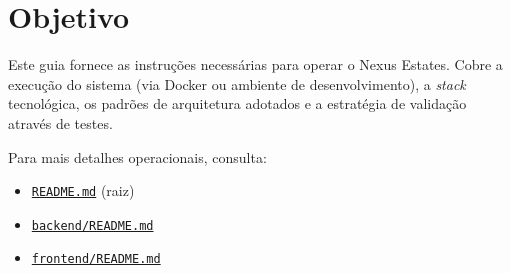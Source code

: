 \section{Objetivo}
Este guia fornece as instruções necessárias para operar o Nexus Estates. Cobre a execução do sistema (via Docker ou ambiente de desenvolvimento), a \textit{stack} tecnológica, os padrões de arquitetura adotados e a estratégia de validação através de testes.

Para mais detalhes operacionais, consulta:
\begin{itemize}[nosep]
  \item \href{https://github.com/kanekitakitos/Nexus-Estates/blob/main/README.md}{\texttt{README.md}} (raiz)
  
  \item \href{https://github.com/kanekitakitos/Nexus-Estates/blob/main/backend/README.md}{\texttt{backend/README.md}}
  
  \item \href{https://github.com/kanekitakitos/Nexus-Estates/blob/main/frontend/README.md}{\texttt{frontend/README.md}}
\end{itemize}